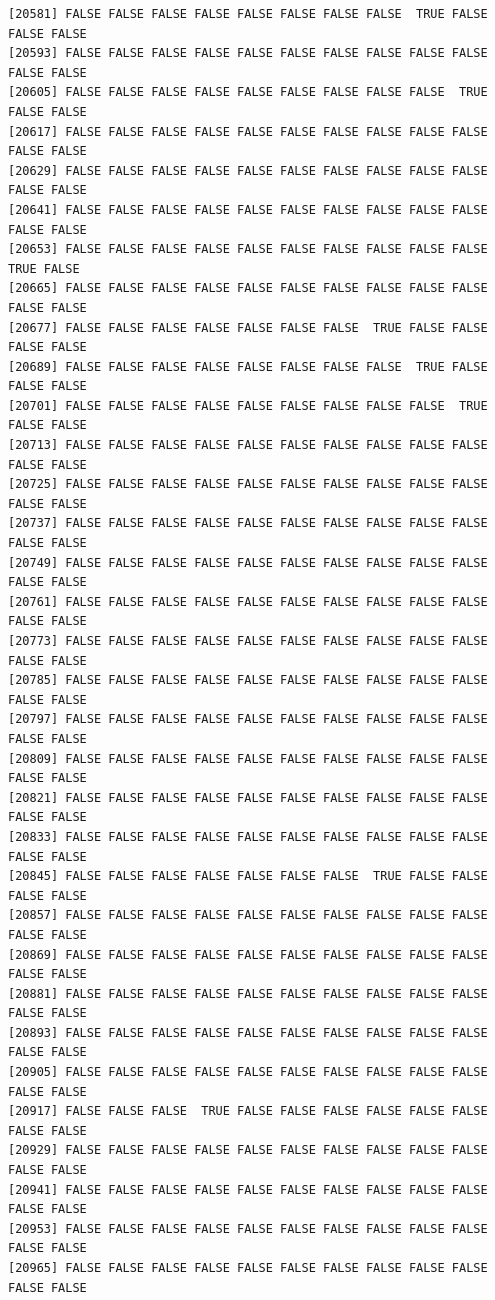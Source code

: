 \documentclass[
  a4paper,
  DIV=11,
  numbers=noendperiod]{scrartcl}
\begin{document}
\begin{verbatim}
[20581] FALSE FALSE FALSE FALSE FALSE FALSE FALSE FALSE  TRUE FALSE FALSE FALSE
[20593] FALSE FALSE FALSE FALSE FALSE FALSE FALSE FALSE FALSE FALSE FALSE FALSE
[20605] FALSE FALSE FALSE FALSE FALSE FALSE FALSE FALSE FALSE  TRUE FALSE FALSE
[20617] FALSE FALSE FALSE FALSE FALSE FALSE FALSE FALSE FALSE FALSE FALSE FALSE
[20629] FALSE FALSE FALSE FALSE FALSE FALSE FALSE FALSE FALSE FALSE FALSE FALSE
[20641] FALSE FALSE FALSE FALSE FALSE FALSE FALSE FALSE FALSE FALSE FALSE FALSE
[20653] FALSE FALSE FALSE FALSE FALSE FALSE FALSE FALSE FALSE FALSE  TRUE FALSE
[20665] FALSE FALSE FALSE FALSE FALSE FALSE FALSE FALSE FALSE FALSE FALSE FALSE
[20677] FALSE FALSE FALSE FALSE FALSE FALSE FALSE  TRUE FALSE FALSE FALSE FALSE
[20689] FALSE FALSE FALSE FALSE FALSE FALSE FALSE FALSE  TRUE FALSE FALSE FALSE
[20701] FALSE FALSE FALSE FALSE FALSE FALSE FALSE FALSE FALSE  TRUE FALSE FALSE
[20713] FALSE FALSE FALSE FALSE FALSE FALSE FALSE FALSE FALSE FALSE FALSE FALSE
[20725] FALSE FALSE FALSE FALSE FALSE FALSE FALSE FALSE FALSE FALSE FALSE FALSE
[20737] FALSE FALSE FALSE FALSE FALSE FALSE FALSE FALSE FALSE FALSE FALSE FALSE
[20749] FALSE FALSE FALSE FALSE FALSE FALSE FALSE FALSE FALSE FALSE FALSE FALSE
[20761] FALSE FALSE FALSE FALSE FALSE FALSE FALSE FALSE FALSE FALSE FALSE FALSE
[20773] FALSE FALSE FALSE FALSE FALSE FALSE FALSE FALSE FALSE FALSE FALSE FALSE
[20785] FALSE FALSE FALSE FALSE FALSE FALSE FALSE FALSE FALSE FALSE FALSE FALSE
[20797] FALSE FALSE FALSE FALSE FALSE FALSE FALSE FALSE FALSE FALSE FALSE FALSE
[20809] FALSE FALSE FALSE FALSE FALSE FALSE FALSE FALSE FALSE FALSE FALSE FALSE
[20821] FALSE FALSE FALSE FALSE FALSE FALSE FALSE FALSE FALSE FALSE FALSE FALSE
[20833] FALSE FALSE FALSE FALSE FALSE FALSE FALSE FALSE FALSE FALSE FALSE FALSE
[20845] FALSE FALSE FALSE FALSE FALSE FALSE FALSE  TRUE FALSE FALSE FALSE FALSE
[20857] FALSE FALSE FALSE FALSE FALSE FALSE FALSE FALSE FALSE FALSE FALSE FALSE
[20869] FALSE FALSE FALSE FALSE FALSE FALSE FALSE FALSE FALSE FALSE FALSE FALSE
[20881] FALSE FALSE FALSE FALSE FALSE FALSE FALSE FALSE FALSE FALSE FALSE FALSE
[20893] FALSE FALSE FALSE FALSE FALSE FALSE FALSE FALSE FALSE FALSE FALSE FALSE
[20905] FALSE FALSE FALSE FALSE FALSE FALSE FALSE FALSE FALSE FALSE FALSE FALSE
[20917] FALSE FALSE FALSE  TRUE FALSE FALSE FALSE FALSE FALSE FALSE FALSE FALSE
[20929] FALSE FALSE FALSE FALSE FALSE FALSE FALSE FALSE FALSE FALSE FALSE FALSE
[20941] FALSE FALSE FALSE FALSE FALSE FALSE FALSE FALSE FALSE FALSE FALSE FALSE
[20953] FALSE FALSE FALSE FALSE FALSE FALSE FALSE FALSE FALSE FALSE FALSE FALSE
[20965] FALSE FALSE FALSE FALSE FALSE FALSE FALSE FALSE FALSE FALSE FALSE FALSE

\end{verbatim}
\end{document}
